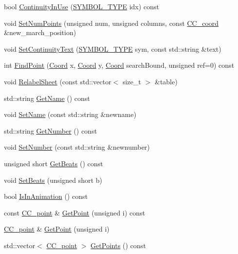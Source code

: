 \begin{DoxyCompactItemize}
bool \hyperlink{a00045_aa85fcbaf88cd05db8fd2ece3aa49b2a8}{Continuity\-In\-Use} (\hyperlink{a00216_a68cd84e0300be6f9ff4474682762c9ee}{S\-Y\-M\-B\-O\-L\-\_\-\-T\-Y\-P\-E} idx) const 
\item 
void \hyperlink{a00045_ac50742b3a8b670e324a510d936b62a85}{Set\-Num\-Points} (unsigned num, unsigned columns, const \hyperlink{a00029}{C\-C\-\_\-coord} \&new\-\_\-march\-\_\-position)
\item 
void \hyperlink{a00045_a72d0ca96ad22fe792ca2469195a27367}{Set\-Continuity\-Text} (\hyperlink{a00216_a68cd84e0300be6f9ff4474682762c9ee}{S\-Y\-M\-B\-O\-L\-\_\-\-T\-Y\-P\-E} sym, const std\-::string \&text)
\item 
int \hyperlink{a00045_a559857fc852c580f272ce53295b59023}{Find\-Point} (\hyperlink{a00216_acd9dae57b712df0e2d3588c0c4798c11}{Coord} x, \hyperlink{a00216_acd9dae57b712df0e2d3588c0c4798c11}{Coord} y, \hyperlink{a00216_acd9dae57b712df0e2d3588c0c4798c11}{Coord} search\-Bound, unsigned ref=0) const 
\item 
void \hyperlink{a00045_a13b5c778494626306264b05ab0e26648}{Relabel\-Sheet} (const std\-::vector$<$ size\-\_\-t $>$ \&table)
\item 
std\-::string \hyperlink{a00045_a8fd7bccd609d86f0df42f12055c32178}{Get\-Name} () const 
\item 
void \hyperlink{a00045_a4a6f9925779f8bf529d448a31c13d21c}{Set\-Name} (const std\-::string \&newname)
\item 
std\-::string \hyperlink{a00045_a8fd164675fb15825e1087abefbd2535d}{Get\-Number} () const 
\item 
void \hyperlink{a00045_a3da05d3a78f81a0131d4101302d6b1c7}{Set\-Number} (const std\-::string \&newnumber)
\item 
unsigned short \hyperlink{a00045_af804d3260ad50627f4b119ac1e070cec}{Get\-Beats} () const 
\item 
void \hyperlink{a00045_a0f6fe0c0cfcf494d7eb7ade61c45e31d}{Set\-Beats} (unsigned short b)
\item 
bool \hyperlink{a00045_a44cce522fb28d50d9950b55e43d977a0}{Is\-In\-Animation} () const 
\item 
const \hyperlink{a00034}{C\-C\-\_\-point} \& \hyperlink{a00045_a435211f11fa9b77df4b2c2a3a08d1c8f}{Get\-Point} (unsigned i) const 
\item 
\hyperlink{a00034}{C\-C\-\_\-point} \& \hyperlink{a00045_a34496eced95d937a56be551b12c7cc8c}{Get\-Point} (unsigned i)
\item 
std\-::vector$<$ \hyperlink{a00034}{C\-C\-\_\-point} $>$ \hyperlink{a00045_a3b9e00f0f832d38a87348f4034462f6d}{Get\-Points} () const 

\end{DoxyCompactItemize}

